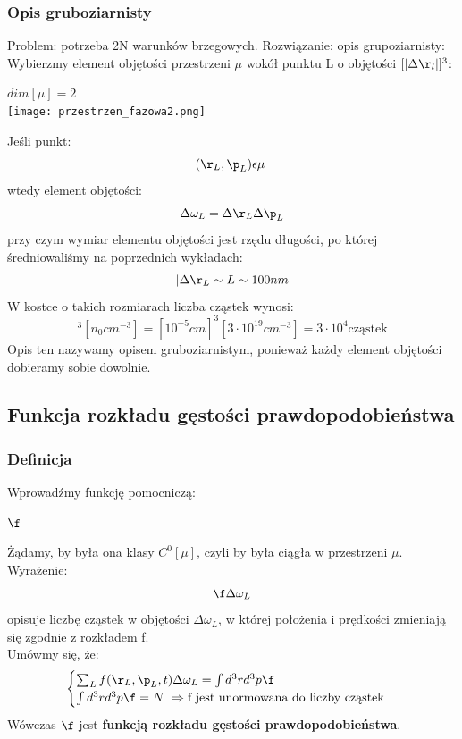 \subsubsection{Opis gruboziarnisty}
Problem: potrzeba 2N warunków brzegowych.
Rozwiązanie: opis grupoziarnisty:\\
Wybierzmy element objętości przestrzeni $\mu$ wokół punktu L o objętości $[|\Delta \r_l|]^3$:
\begin{center}$dim[\mu]=2$\\
\texttt{[image: przestrzen\_fazowa2.png]}
\end{center}
Jeśli punkt:
\begin{equation} (\r_L,\p_L)\epsilon\mu~ \nonumber \end{equation}
wtedy element objętości:
\begin{equation}\Delta\omega_L=\Delta\r_L\Delta\p_L\end{equation}
przy czym wymiar elementu objętości jest rzędu długości, po której średniowaliśmy na poprzednich wykładach:
\begin{equation}|\Delta\r_L\sim L\sim 100nm\end{equation}
W kostce o takich rozmiarach liczba cząstek wynosi:
\begin{equation}[|\Delta\r_L|]^3[n_0 cm^{-3}]=[10^{-5}cm]^3[3\cdot10^{19}cm^{-3}]=3\cdot 10^4 \text{cząstek}\nonumber\end{equation}
Opis ten nazywamy opisem gruboziarnistym, ponieważ każdy element objętości dobieramy sobie dowolnie.

\subsection{Funkcja rozkładu gęstości prawdopodobieństwa}
\subsubsection{Definicja}
Wprowadźmy funkcję pomocniczą:
\begin{center}$\f$\end{center}
Żądamy, by była ona klasy $C^0[\mu]$, czyli by była ciągła w przestrzeni $\mu$.
Wyrażenie:
\begin{equation}\f\Delta\omega_L\end{equation}
opisuje liczbę cząstek w objętości $\Delta\omega_L$, w której położenia i prędkości zmieniają się zgodnie z rozkładem f.\\
Umówmy się, że:
\begin{equation}
\begin{cases} \sum_L f(\r_L,\p_L,t)\Delta\omega_L=\int d^3 r d^3 p\f \\ \int d^3r d^3p\f=N~\Rightarrow\text{f jest unormowana do liczby cząstek}\end{cases}
\end{equation}
Wówczas $\f$ jest \textbf{funkcją rozkładu gęstości prawdopodobieństwa}.
